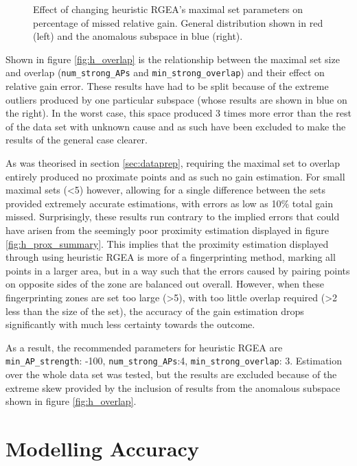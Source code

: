 \documentclass{UoYCSproject}
\begin{document}
\begin{figure}[h]
\begin{minipage}{0.5\textwidth}
                    \end{minipage}
                    \caption{Effect of changing heuristic RGEA's maximal set parameters on percentage of missed relative gain. General distribution shown in red (left) and the anomalous subspace in blue (right).}
                \end{figure}
                
                Shown in figure \ref{fig:h_overlap} is the relationship between the maximal set size and overlap (\texttt{num\_strong\_APs} and \texttt{min\_strong\_overlap}) and their effect on relative gain error. These results have had to be split because of the extreme outliers produced by one particular subspace (whose results are shown in blue on the right). In the worst case, this space produced 3 times more error than the rest of the data set with unknown cause and as such have been excluded to make the results of the general case clearer. 
                
                As was theorised in section \ref{sec:dataprep}, requiring the maximal set to overlap entirely produced no proximate points and as such no gain estimation. For small maximal sets (<5) however, allowing for a single difference between the sets provided extremely accurate estimations, with errors as low as 10\% total gain missed. Surprisingly, these results run contrary to the implied errors that could have arisen from the seemingly poor proximity estimation displayed in figure \ref{fig:h_prox_summary}. This implies that the proximity estimation displayed through using heuristic RGEA is more of a fingerprinting method, marking all points in a larger area, but in a way such that the errors caused by pairing points on opposite sides of the zone are balanced out overall. However, when these fingerprinting zones are set too large (>5), with too little overlap required (>2 less than the size of the set), the accuracy of the gain estimation drops significantly with much less certainty towards the outcome. 
                
                As a result, the recommended parameters for heuristic RGEA are \texttt{min\_AP\_strength}: -100, \texttt{num\_strong\_APs}:4, \texttt{min\_strong\_overlap}: 3. Estimation over the whole data set was tested, but the results are excluded because of the extreme skew provided by the inclusion of results from the anomalous subspace shown in figure \ref{fig:h_overlap}.
	    
	    \section{Modelling Accuracy}
	    \label{sec:modeleval}
        
\end{document}
